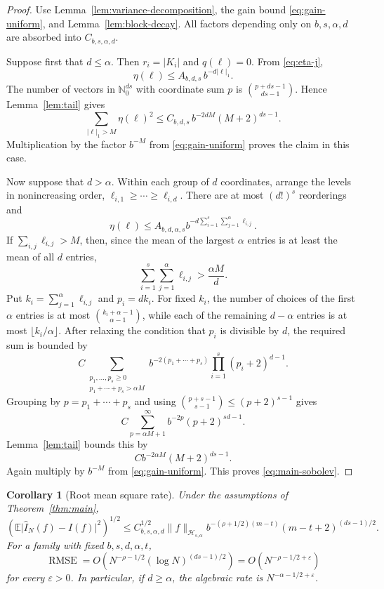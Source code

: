 \documentclass[11pt]{article}
\newtheorem{corollary}[theorem]{Corollary}
\newcommand{\Nzero}{\mathbb N_0}
\newcommand{\abs}[1]{\lvert #1\rvert}
\newcommand{\norm}[1]{\lVert #1\rVert}
\newcommand{\floor}[1]{\lfloor #1\rfloor}
\newcommand{\eps}{\varepsilon}
\begin{document}
\begin{proof}
Use Lemma~\ref{lem:variance-decomposition}, the gain bound
\eqref{eq:gain-uniform}, and Lemma~\ref{lem:block-decay}.  All
factors depending only on $b,s,\alpha,d$ are absorbed into
$C_{b,s,\alpha,d}$.

Suppose first that $d\le\alpha$.  Then $r_i=\abs{K_i}$ and
$q(\boldsymbol\ell)=0$.  From \eqref{eq:eta-j},
\[
 \eta(\boldsymbol\ell)
 \le A_{b,d,s}\,b^{-d\abs{\boldsymbol\ell}_1}.
\]
The number of vectors in $\Nzero^{ds}$ with coordinate sum $p$ is
$\binom{p+ds-1}{ds-1}$.  Hence Lemma~\ref{lem:tail} gives
\[
 \sum_{\abs{\boldsymbol\ell}_1>M}
 \eta(\boldsymbol\ell)^2
 \le C_{b,d,s}\,b^{-2dM}(M+2)^{ds-1}.
\]
Multiplication by the factor $b^{-M}$ from \eqref{eq:gain-uniform} proves the
claim in this case.

Now suppose that $d>\alpha$.  Within each group of $d$ coordinates, arrange the
levels in nonincreasing order,
$\ell_{i,1}\ge\cdots\ge\ell_{i,d}$.  There are at most $(d!)^s$ reorderings and
\[
 \eta(\boldsymbol\ell)
 \le A_{b,d,\alpha,s}
 b^{-d\sum_{i=1}^s\sum_{j=1}^{\alpha}\ell_{i,j}}.
\]
If $\sum_{i,j}\ell_{i,j}>M$, then, since the mean of the largest $\alpha$
entries is at least the mean of all $d$ entries,
\[
 \sum_{i=1}^s\sum_{j=1}^{\alpha}\ell_{i,j}>\frac{\alpha M}{d}.
\]
Put $k_i=\sum_{j=1}^{\alpha}\ell_{i,j}$ and $p_i=dk_i$.  For fixed $k_i$, the
number of choices of the first $\alpha$ entries is at most
$\binom{k_i+\alpha-1}{\alpha-1}$, while each of the remaining $d-\alpha$
entries is at most $\floor{k_i/\alpha}$.  After relaxing the condition that $p_i$ is divisible by $d$, the required
sum is bounded by
\[
 C\sum_{\substack{p_1,\ldots,p_s\ge0\\p_1+\cdots+p_s>\alpha M}}
 b^{-2(p_1+\cdots+p_s)}
 \prod_{i=1}^s(p_i+2)^{d-1}.
\]
Grouping by $p=p_1+\cdots+p_s$ and using
$\binom{p+s-1}{s-1}\le(p+2)^{s-1}$ gives
\[
 C\sum_{p=\alpha M+1}^{\infty}
 b^{-2p}(p+2)^{sd-1}.
\]
Lemma~\ref{lem:tail} bounds this by
\[
 Cb^{-2\alpha M}(M+2)^{ds-1}.
\]
Again multiply by $b^{-M}$ from \eqref{eq:gain-uniform}.  This proves \eqref{eq:main-sobolev}.
\end{proof}

\begin{corollary}[Root mean square rate]\label{cor:rmse}
Under the assumptions of Theorem~\ref{thm:main},
\[
 \left(\mathbb E\abs{\widehat I_N(f)-I(f)}^2\right)^{1/2}
 \le C_{b,s,\alpha,d}^{1/2}\norm f_{\mathcal H_{s,\alpha}}
 b^{-(\rho+1/2)(m-t)}(m-t+2)^{(ds-1)/2}.
\]
For a family with fixed $b,s,d,\alpha,t$,
\[
 \operatorname{RMSE}
 =O\!\left(N^{-\rho-1/2}(\log N)^{(ds-1)/2}\right)
 =O\!\left(N^{-\rho-1/2+\eps}\right)
\]
for every $\eps>0$.  In particular, if $d\ge\alpha$, the algebraic rate is
$N^{-\alpha-1/2+\eps}$.
\end{corollary}
\end{document}
